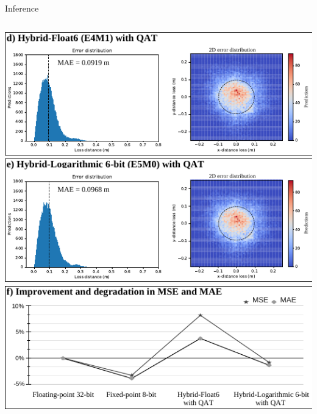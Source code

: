 \begin{frame}{Inference}
\begin{columns}[T]
		\begin{column}{0.5\textwidth}
			\centering
			\includegraphics[width=0.95\linewidth]{slides/figures/model_evaluation_d.pdf} %
			\pause %
			\includegraphics[width=0.95\linewidth]{slides/figures/model_evaluation_e.pdf} %
			\pause %
			\includegraphics[width=0.95\linewidth]{slides/figures/model_evaluation_f.pdf} %
		\end{column}
	\end{columns}
\end{frame}

